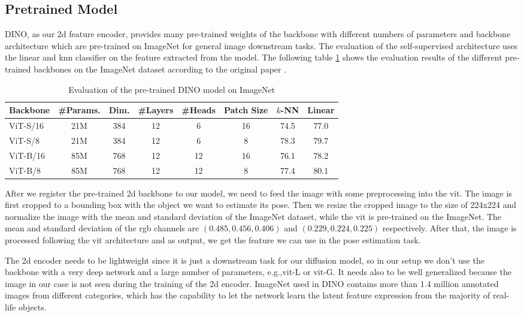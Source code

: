 \documentclass[12pt,DIV14,BCOR12mm,a4paper,footinclude=false,headinclude,parskip=half-,twoside,openright,cleardoublepage=empty,toc=index,bibliography=totoc,listof=totoc]{scrreprt}
\numberwithin{equation}{chapter}
\begin{document}
\subsection{Pretrained Model} 
DINO, as our \gls{2d} feature encoder, provides many pre-trained weights of the backbone with different numbers of parameters and backbone architecture which are pre-trained on ImageNet for general image downstream tasks. The evaluation of the self-supervised architecture uses the linear and \gls{knn} classifier on the feature extracted from the model. The following table \ref{tab:dino} shows the evaluation results of the different pre-trained backbones on the ImageNet dataset according to the original paper \cite{caron2021emerging}.
\begin{table}[ht]
  \centering
  \caption{Evaluation of the pre-trained DINO model on ImageNet}
  \label{tab:dino}
  \begin{tabular}{l | c c c c c c c}
      \toprule
      Backbone & \#Params. & Dim. & \#Layers & \#Heads & Patch Size & $k$-NN & Linear\\
      \midrule
      ViT-S/16 & 21M & 384 & 12 & 6 & 16 & 74.5 & 77.0 \\
      ViT-S/8 & 21M & 384 & 12 & 6 & 8 & 78.3 & 79.7 \\
      ViT-B/16 & 85M & 768 & 12 & 12 & 16 & 76.1 & 78.2 \\
      ViT-B/8 & 85M & 768 & 12 & 12 & 8 & 77.4 & 80.1 \\
      \bottomrule
  \end{tabular}
\end{table}

After we register the pre-trained \gls{2d} backbone to our model, we need to feed the image with some preprocessing into the \gls{vit}. The image is first cropped to a bounding box with the object we want to estimate its pose. Then we resize the cropped image to the size of 224x224 and normalize the image with the mean and standard deviation of the ImageNet dataset, while the \gls{vit} is pre-trained on the ImageNet. The mean and standard deviation of the \gls{rgb} channels are $(0.485, 0.456, 0.406)$ and $(0.229, 0.224, 0.225)$ respectively. After that, the image is processed following the \gls{vit} architecture and as output, we get the feature we can use in the pose estimation task. 

The \gls{2d} encoder needs to be lightweight since it is just a downstream task for our diffusion model, so in our setup we don't use the backbone with a very deep network and a large number of parameters, e.g.,\gls{vit}-L or \gls{vit}-G. It needs also to be well generalized because the image in our case is not seen during the training of the \gls{2d} encoder. ImageNet used in DINO contains more than 1.4 million annotated images from different categories, which has the capability to let the network learn the latent feature expression from the majority of real-life objects. 
\end{document}
